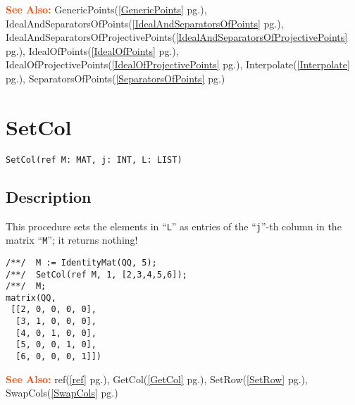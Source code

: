 \documentclass[a4paper]{mybook}
\newenvironment{command}{}{} %
\newcommand\SeeAlso{\par\textcolor{OrangeRed}{\textbf{\large See Also: }}}
\begin{document}
\begin{command}
\SeeAlso %
  GenericPoints(\ref{GenericPoints} pg.\pageref{GenericPoints}), 
    IdealAndSeparatorsOfPoints(\ref{IdealAndSeparatorsOfPoints} pg.\pageref{IdealAndSeparatorsOfPoints}), 
    IdealAndSeparatorsOfProjectivePoints(\ref{IdealAndSeparatorsOfProjectivePoints} pg.\pageref{IdealAndSeparatorsOfProjectivePoints}), 
    IdealOfPoints(\ref{IdealOfPoints} pg.\pageref{IdealOfPoints}), 
    IdealOfProjectivePoints(\ref{IdealOfProjectivePoints} pg.\pageref{IdealOfProjectivePoints}), 
    Interpolate(\ref{Interpolate} pg.\pageref{Interpolate}), 
    SeparatorsOfPoints(\ref{SeparatorsOfPoints} pg.\pageref{SeparatorsOfPoints})
\end{command} %

\section{SetCol}
\label{SetCol}
\begin{command} %


\begin{Verbatim}[label=syntax, rulecolor=\color{MidnightBlue},
frame=single]
SetCol(ref M: MAT, j: INT, L: LIST)
\end{Verbatim}


\subsection*{Description}

This procedure sets the elements in ``\verb&L&'' as entries of the
``\verb&j&''-th column in the matrix ``\verb&M&''; it returns nothing!
\begin{Verbatim}[label=example, rulecolor=\color{PineGreen}, frame=single]
/**/  M := IdentityMat(QQ, 5);
/**/  SetCol(ref M, 1, [2,3,4,5,6]);
/**/  M;
matrix(QQ,
 [[2, 0, 0, 0, 0],
  [3, 1, 0, 0, 0],
  [4, 0, 1, 0, 0],
  [5, 0, 0, 1, 0],
  [6, 0, 0, 0, 1]])
\end{Verbatim}


\SeeAlso %
  ref(\ref{ref} pg.\pageref{ref}), 
    GetCol(\ref{GetCol} pg.\pageref{GetCol}), 
    SetRow(\ref{SetRow} pg.\pageref{SetRow}), 
    SwapCols(\ref{SwapCols} pg.\pageref{SwapCols})
\end{command} %
\end{document}
